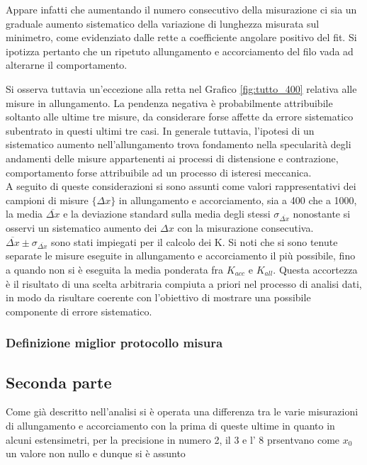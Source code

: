 \documentclass[a4paper,11pt,oneside]{article}
\begin{document}
Appare infatti che aumentando il numero consecutivo della misurazione ci sia un graduale aumento sistematico della variazione di lunghezza misurata sul minimetro, come evidenziato dalle rette a coefficiente angolare positivo del fit. Si ipotizza pertanto che un ripetuto allungamento e accorciamento del filo vada ad alterarne il comportamento.

Si osserva tuttavia un'eccezione alla retta nel Grafico \ref{fig:tutto_400} relativa alle misure in allungamento. La pendenza negativa è probabilmente attribuibile soltanto alle ultime tre misure, da considerare forse affette da errore sistematico subentrato in questi ultimi tre casi.
In generale tuttavia, l'ipotesi di un sistematico aumento nell'allungamento trova fondamento nella specularità degli andamenti delle misure appartenenti ai processi di distensione e contrazione, comportamento forse attribuibile ad un processo di isteresi meccanica.\\
A seguito di queste considerazioni si sono assunti come valori rappresentativi dei campioni di misure $\{ \Delta x \}$ in allungamento e accorciamento, sia a 400 che a 1000, la media $\overline{\Delta x}$ e la deviazione standard sulla media degli stessi $\sigma_{\overline{\Delta x}}$ nonostante si osservi un sistematico aumento dei $\Delta x$ con la misurazione consecutiva.\\
$\overline{\Delta x} \pm \sigma_{\overline{\Delta x}}$ sono stati impiegati per il calcolo dei K. Si noti che si sono tenute separate le misure eseguite in allungamento e accorciamento il più possibile, fino a quando non si è eseguita la media ponderata  fra $K_{acc}$ e $K_{all}$. Questa accortezza è il risultato di una scelta arbitraria compiuta a priori nel processo di analisi dati, in modo da risultare coerente con l'obiettivo di mostrare una possibile componente di errore sistematico.


\subsubsection*{Definizione miglior protocollo misura}



\subsection{Seconda parte}
Come già descritto nell'analisi si è operata una differenza tra le varie misurazioni di allungamento e accorciamento con la prima di queste ultime in quanto in alcuni estensimetri, per la precisione in numero 2, il 3 e l' 8 prsentvano come $x_0$ un valore  non nullo e dunque si è assunto 
\end{document}
